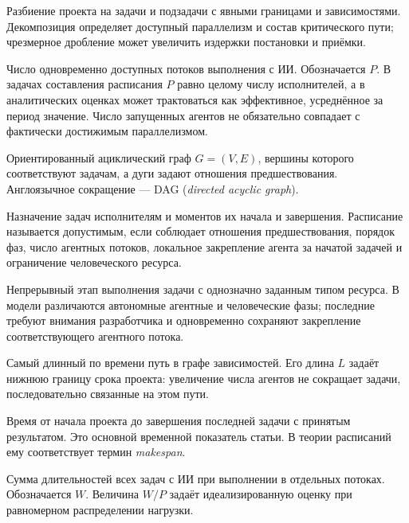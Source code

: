 \begin{description}[style=nextline]
  \item[Декомпозиция] Разбиение проекта на задачи и подзадачи с явными
  границами и зависимостями. Декомпозиция определяет доступный параллелизм и
  состав критического пути; чрезмерное дробление может увеличить издержки
  постановки и приёмки.

  \item[Параллелизм] Число одновременно доступных потоков выполнения с ИИ.
  Обозначается $P$. В задачах составления расписания $P$ равно целому числу
  исполнителей, а в аналитических оценках может трактоваться как эффективное,
  усреднённое за период значение. Число запущенных агентов не обязательно
  совпадает с фактически достижимым параллелизмом.

  \item[Граф зависимостей] Ориентированный ациклический граф $G=(V,E)$,
  вершины которого соответствуют задачам, а дуги задают отношения
  предшествования. Англоязычное сокращение --- DAG
  (\emph{directed acyclic graph}).

  \item[Расписание] Назначение задач исполнителям и моментов их начала и
  завершения. Расписание называется допустимым, если соблюдает отношения
  предшествования, порядок фаз, число агентных потоков, локальное закрепление
  агента за начатой задачей и ограничение человеческого ресурса.

  \item[Фаза задачи] Непрерывный этап выполнения задачи с однозначно заданным
  типом ресурса. В модели различаются автономные агентные и человеческие фазы;
  последние требуют внимания разработчика и одновременно сохраняют
  закрепление соответствующего агентного потока.

  \item[Критический путь] Самый длинный по времени путь в графе зависимостей.
  Его длина $L$ задаёт нижнюю границу срока проекта: увеличение числа агентов
  не сокращает задачи, последовательно связанные на этом пути.

  \item[Время завершения всех работ] Время от начала проекта до завершения
  последней задачи с принятым результатом. Это основной временной показатель
  статьи. В теории расписаний ему соответствует термин \emph{makespan}.

  \item[Суммарная работа] Сумма длительностей всех задач с ИИ при выполнении в
  отдельных потоках. Обозначается $W$. Величина $W/P$ задаёт идеализированную
  оценку при равномерном распределении нагрузки.


\end{description}
